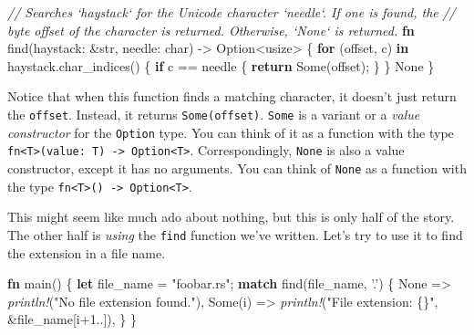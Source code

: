 \documentclass[a4paper,]{book}
\newenvironment{Shaded}{\begin{snugshade}}{\end{snugshade}}
\newcommand{\KeywordTok}[1]{\textcolor[rgb]{0.13,0.29,0.53}{\textbf{{#1}}}}
\newcommand{\DataTypeTok}[1]{\textcolor[rgb]{0.13,0.29,0.53}{{#1}}}
\newcommand{\DecValTok}[1]{\textcolor[rgb]{0.00,0.00,0.81}{{#1}}}
\newcommand{\ConstantTok}[1]{\textcolor[rgb]{0.00,0.00,0.00}{{#1}}}
\newcommand{\CharTok}[1]{\textcolor[rgb]{0.31,0.60,0.02}{{#1}}}
\newcommand{\StringTok}[1]{\textcolor[rgb]{0.31,0.60,0.02}{{#1}}}
\newcommand{\CommentTok}[1]{\textcolor[rgb]{0.56,0.35,0.01}{\textit{{#1}}}}
\newcommand{\PreprocessorTok}[1]{\textcolor[rgb]{0.56,0.35,0.01}{\textit{{#1}}}}
\newcommand{\NormalTok}[1]{{#1}}
\begin{document}
\begin{Shaded}
\begin{Highlighting}[]
\CommentTok{// Searches `haystack` for the Unicode character `needle`. If one is found, the}
\CommentTok{// byte offset of the character is returned. Otherwise, `None` is returned.}
\KeywordTok{fn} \NormalTok{find(haystack: &}\DataTypeTok{str}\NormalTok{, needle: }\DataTypeTok{char}\NormalTok{) -> }\DataTypeTok{Option}\NormalTok{<}\DataTypeTok{usize}\NormalTok{> \{}
    \KeywordTok{for} \NormalTok{(offset, c) }\KeywordTok{in} \NormalTok{haystack.char_indices() \{}
        \KeywordTok{if} \NormalTok{c == needle \{}
            \KeywordTok{return} \ConstantTok{Some}\NormalTok{(offset);}
        \NormalTok{\}}
    \NormalTok{\}}
    \ConstantTok{None}
\NormalTok{\}}
\end{Highlighting}
\end{Shaded}

Notice that when this function finds a matching character, it doesn't
just return the \texttt{offset}. Instead, it returns
\texttt{Some(offset)}. \texttt{Some} is a variant or a \emph{value
constructor} for the \texttt{Option} type. You can think of it as a
function with the type
\texttt{fn\textless{}T\textgreater{}(value:\ T)\ -\textgreater{}\ Option\textless{}T\textgreater{}}.
Correspondingly, \texttt{None} is also a value constructor, except it
has no arguments. You can think of \texttt{None} as a function with the
type
\texttt{fn\textless{}T\textgreater{}()\ -\textgreater{}\ Option\textless{}T\textgreater{}}.

This might seem like much ado about nothing, but this is only half of
the story. The other half is \emph{using} the \texttt{find} function
we've written. Let's try to use it to find the extension in a file name.

\begin{Shaded}
\begin{Highlighting}[]
\KeywordTok{fn} \NormalTok{main() \{}
    \KeywordTok{let} \NormalTok{file_name = }\StringTok{"foobar.rs"}\NormalTok{;}
    \KeywordTok{match} \NormalTok{find(file_name, }\CharTok{'.'}\NormalTok{) \{}
        \ConstantTok{None} \NormalTok{=> }\PreprocessorTok{println!}\NormalTok{(}\StringTok{"No file extension found."}\NormalTok{),}
        \ConstantTok{Some}\NormalTok{(i) => }\PreprocessorTok{println!}\NormalTok{(}\StringTok{"File extension: \{\}"}\NormalTok{, &file_name[i+}\DecValTok{1.}\NormalTok{.]),}
    \NormalTok{\}}
\NormalTok{\}}
\end{Highlighting}
\end{Shaded}
\end{document}
